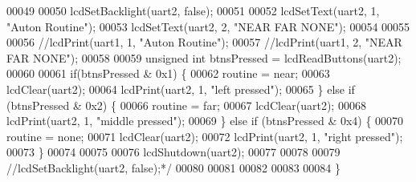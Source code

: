 \begin{DoxyCode}
00049 \textcolor{comment}{}
00050 \textcolor{comment}{lcdSetBacklight(uart2, false);}
00051 \textcolor{comment}{}
00052 \textcolor{comment}{lcdSetText(uart2, 1, "Auton Routine");}
00053 \textcolor{comment}{lcdSetText(uart2, 2, "NEAR   FAR   NONE");}
00054 \textcolor{comment}{}
00055 \textcolor{comment}{}
00056 \textcolor{comment}{//lcdPrint(uart1, 1, "Auton Routine");}
00057 \textcolor{comment}{//lcdPrint(uart1, 2, "NEAR       FAR       NONE");}
00058 \textcolor{comment}{}
00059 \textcolor{comment}{unsigned int btnsPressed = lcdReadButtons(uart2);}
00060 \textcolor{comment}{}
00061 \textcolor{comment}{  if(btnsPressed & 0x1) \{}
00062 \textcolor{comment}{    routine = near;}
00063 \textcolor{comment}{    lcdClear(uart2);}
00064 \textcolor{comment}{    lcdPrint(uart2, 1, "left pressed");}
00065 \textcolor{comment}{  \} else if (btnsPressed & 0x2) \{}
00066 \textcolor{comment}{    routine = far;}
00067 \textcolor{comment}{    lcdClear(uart2);}
00068 \textcolor{comment}{    lcdPrint(uart2, 1, "middle pressed");}
00069 \textcolor{comment}{  \} else if (btnsPressed & 0x4) \{}
00070 \textcolor{comment}{    routine = none;}
00071 \textcolor{comment}{    lcdClear(uart2);}
00072 \textcolor{comment}{    lcdPrint(uart2, 1, "right pressed");}
00073 \textcolor{comment}{  \}}
00074 \textcolor{comment}{}
00075 \textcolor{comment}{}
00076 \textcolor{comment}{  lcdShutdown(uart2);}
00077 \textcolor{comment}{}
00078 \textcolor{comment}{}
00079 \textcolor{comment}{  //lcdSetBacklight(uart2, false);*/}
00080 
00081 
00082 
00083 
00084 \}
\end{DoxyCode}
